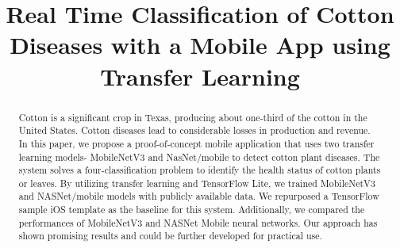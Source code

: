 \documentclass[conference]{IEEEtran}
\begin{document}
\title{Real Time Classification of Cotton Diseases with a Mobile App using Transfer Learning \\

}

\author{
\and


\and 

\and
{}


}

\maketitle

\begin{abstract}
Cotton is a significant crop in Texas, producing about one-third of the cotton in the United States. Cotton diseases lead to considerable losses in production and revenue. In this paper, we propose a proof-of-concept mobile application that uses two transfer learning models- MobileNetV3 and NasNet/mobile to detect cotton plant diseases. The system solves a four-classification problem to identify the health status of cotton plants or leaves. By utilizing transfer learning and TensorFlow Lite, we trained MobileNetV3 and NASNet/mobile models with publicly available data. We repurposed a TensorFlow sample iOS template as the baseline for this system. Additionally, we compared the performances of MobileNetV3 and NASNet Mobile neural networks. Our approach has shown promising results and could be further developed for practical use.
\end{abstract}
\end{document}

